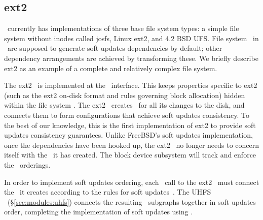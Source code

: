 \subsection{ext2}
\label{sec:modules:ext2}

\Kudos\ currently has implementations of three base file system types: a simple
file system without inodes called josfs, Linux ext2, and 4.2 BSD UFS. File
system \modules\ in \Kudos\ are supposed to generate soft updates dependencies
by default; other dependency arrangements are achieved by transforming these.
We briefly describe ext2 as an example of a complete and relatively complex file
system.

The ext2 \module\ is implemented at the \LFS\ interface. This keeps properties
specific to ext2 (such as the ext2 on-disk format and rules governing block
allocation) hidden within the file system \module. The ext2 \module\ creates
\chdescs\ for all its changes to the disk, and connects them to form
configurations that achieve soft updates consistency. To the best of our
knowledge, this is the first implementation of ext2 to provide soft updates
consistency guarantees. Unlike FreeBSD's soft updates implementation, once the
dependencies have been hooked up, the ext2 \module\ no longer needs to concern
itself with the \chdescs\ it has created. The block device subsystem will track
and enforce the \chdesc\ orderings.

In order to implement soft updates ordering, each \LFS\ call to the ext2
\module\ must connect the \chdescs\ it creates according to the rules for soft
updates~\cite{ganger00soft}. The UHFS \module\ (\S\ref{sec:modules:uhfs})
connects the resulting \chdesc\ subgraphs together in soft updates order,
completing the implementation of soft updates using \chdescs.

